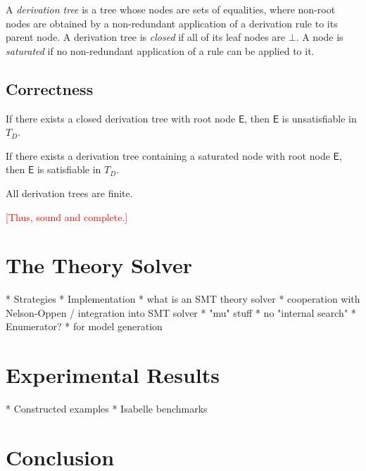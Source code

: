 \documentclass[a4paper,oribibl,envcountsame,draft]{llncs}
\newcommand{\Ec}{\mathsf{E}}
\newcommand{\rem}[1]{\textcolor{red}{[#1]}}
\newcommand{\thD}{T_{D}}
\begin{document}
A \emph{derivation tree} is a tree whose nodes are sets of equalities, where non-root nodes are obtained by a non-redundant application of a derivation rule to its parent node.
A derivation tree is \emph{closed} if all of its leaf nodes are $\bot$.
A node is \emph{saturated} if no non-redundant application of a rule can be applied to it.
  

\subsection{Correctness}

\begin{lemma}
If there exists a closed derivation tree with root node $\Ec$, then $\Ec$ is unsatisfiable in $\thD$.
\end{lemma}

\begin{lemma}
If there exists a derivation tree containing a saturated node with root node $\Ec$, then $\Ec$ is satisfiable in $\thD$.
\end{lemma}

\begin{lemma}[Termination]
All derivation trees are finite.
\end{lemma}

\rem{Thus, sound and complete.}
  
\section{The Theory Solver}
\label{sec:the-theory-solver}

  * Strategies
  * Implementation
    * what is an SMT theory solver
    * cooperation with Nelson-Oppen / integration into SMT solver
    * "mu" stuff
    * no "internal search"
  * Enumerator?
    * for model generation


\section{Experimental Results}
\label{sec:experimental-results}

  * Constructed examples
  * Isabelle benchmarks

\section{Conclusion}
\label{sec:conclusion}
\end{document}
